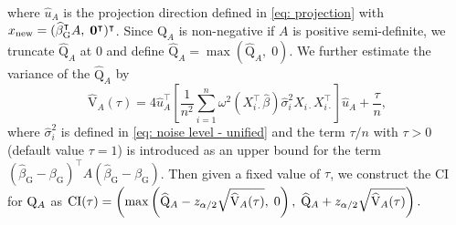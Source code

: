where $\widehat{u}_A$ is the projection direction defined in \eqref{eq: projection} with $x_{\rm new} = ( \widehat{\beta}_{\textrm{G}}^\intercal A, \; \mathbf{0}^{\intercal})^\intercal$.
Since ${\mathrm{Q}}_A$ is non-negative if $A$ is positive semi-definite, we truncate $\widehat{\mathrm{Q}}_A$ at $0$ and define
$
\widehat{\mathrm{Q}}_A = \max\left(\widehat{\mathrm{Q}}_A, \; 0\right)
$.
We further estimate the variance of the $\widehat{\mathrm{Q}}_A$ by
\begin{equation}
    \widehat{\mathrm{V}}_A(\tau) = 4 \widehat{u}_A^\intercal \left[\frac{1}{n^2} \sum_{i=1}^n \omega^2(X_{i\cdot}^\intercal \widehat{\beta}) \widehat{\sigma}_i^2 X_{i\cdot} X_{i\cdot}^\intercal \right] \widehat{u}_A + \frac{\tau}{n},
    \label{eq: QF CI1 - unifed}
\end{equation}
where $\widehat{\sigma}^2_i$ is defined in \eqref{eq: noise level - unified} and the term $\tau/n$ with $\tau>0$ (default value $\tau=1$) is introduced as an upper bound for the term $( \widehat{\beta}_{\textrm{G}} - \beta_{\textrm{G}} )^\intercal A ( \widehat{\beta}_{\textrm{G}} - \beta_{\textrm{G}} )$. %
Then given a fixed value of $\tau$, we construct the CI for ${\rm Q}_A$ as 
${\rm CI}(\tau) = \left(\max\left(\widehat{\rm Q}_A - z_{\alpha/2}\sqrt{\widehat{\rm V}_A(\tau)},\; 0\right),\; \widehat{\rm Q}_A + z_{\alpha/2}\sqrt{\widehat{\rm V}_A(\tau)}\right).$ 

